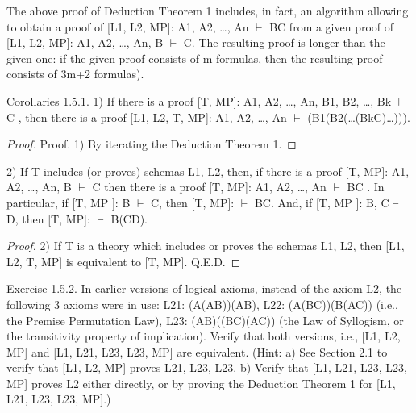 The above proof of Deduction Theorem 1 includes, in fact, an algorithm allowing to obtain a proof of
[L1, L2, MP]: A1, A2, \ldots , An \(\vdash\) B\IMPLIES C from a given proof of [L1, L2, MP]: A1, A2, \ldots , An, B \(\vdash\) C. The
resulting proof is longer than the given one: if the given proof consists of m formulas, then the resulting
proof consists of 3m+2 formulas).

\begin{corollary}

Corollaries 1.5.1. 1) If there is a proof [T, MP]: A1, A2, \ldots , An, B1, B2, \ldots , Bk \(\vdash\) C , then there is a proof [L1, L2, T, MP]: A1, A2, \ldots , An \(\vdash\) (B1\IMPLIES (B2\IMPLIES (\ldots \IMPLIES (Bk\IMPLIES C)\ldots ))).
\end{corollary}

\begin{proof}
Proof. 1) By iterating the Deduction Theorem 1.
\end{proof}

\begin{corollary}
2) If T includes (or proves) schemas L1, L2, then, if there is a proof [T, MP]: A1, A2, \ldots , An, B \(\vdash\) C then
there is a proof [T, MP]: A1, A2, \ldots , An \(\vdash\) B\IMPLIES C .
In particular, if [T, MP ]: B \(\vdash\) C, then [T, MP]: \(\vdash\) B\IMPLIES C.
And, if [T, MP ]: B, C\(\vdash\) D, then [T, MP]: \(\vdash\) B\IMPLIES (C\IMPLIES D).
\end{corollary}

\begin{proof}
2) If T is a theory which includes or proves the schemas L1, L2, then [L1, L2, T, MP] is equivalent to [T, MP]. Q.E.D.
\end{proof}

\begin{exercise}
Exercise 1.5.2. In earlier versions of logical axioms, instead of the axiom L2, the following 3 axioms
were in use:
L21: (A\IMPLIES (A\IMPLIES B))\IMPLIES (A\IMPLIES B),
L22: (A\IMPLIES (B\IMPLIES C))\IMPLIES (B\IMPLIES (A\IMPLIES C)) (i.e., the Premise Permutation Law),
L23: (A\IMPLIES B)\IMPLIES ((B\IMPLIES C)\IMPLIES (A\IMPLIES C)) (the Law of Syllogism, or the transitivity property of implication).
Verify that both versions, i.e., [L1, L2, MP] and [L1, L21, L23, L23, MP] are equivalent. (Hint: a) See
Section 2.1 to verify that [L1, L2, MP] proves L21, L23, L23. b) Verify that [L1, L21, L23, L23, MP] proves
L2 either directly, or by proving the Deduction Theorem 1 for [L1, L21, L23, L23, MP].)
\end{exercise}

